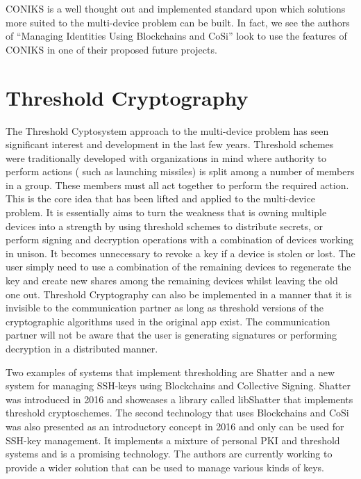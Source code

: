 CONIKS is a well thought out and implemented standard upon which solutions more suited to the multi-device problem can be built. In fact, we see the authors of ``Managing Identities Using Blockchains and CoSi'' \cite{Kokoris-kogias} look to use the features of CONIKS in one of their proposed future projects.


\section{Threshold Cryptography}

The Threshold Cyptosystem approach to the multi-device problem has seen significant interest and development in the last few years. Threshold schemes were traditionally developed with organizations in mind where authority to perform actions ( such as launching missiles) is split among a number of members in a group. These members must all act together to perform the required action. This is the core idea that has been lifted and applied to the multi-device problem. It is essentially aims to turn the weakness that is owning multiple devices into a strength by using threshold schemes to distribute secrets, or perform signing and decryption operations with a combination of devices working in unison\cite{Desmedt2001, Atwater2016}. It becomes unnecessary to revoke a key if a device is stolen or lost. The user simply need to use a combination of the remaining devices to regenerate the key and create new shares among the remaining devices whilst leaving the old one out. Threshold Cryptography can also be implemented in a manner that it is invisible to the communication partner as long as threshold versions of the cryptographic algorithms used in the original app exist. The communication partner will not be aware that the user is generating signatures or performing decryption in a distributed manner.

Two examples of systems that implement thresholding are Shatter \cite{Atwater2016} and a new system for managing SSH-keys using Blockchains and Collective Signing\cite{Kokoris-kogias}. Shatter was introduced in 2016 and showcases a library called libShatter that implements threshold cryptoschemes. The second technology that uses Blockchains and CoSi was also presented as an introductory concept in 2016 and only can be used for SSH-key management. It implements a mixture of personal PKI and threshold systems and is a promising technology. The authors are currently working to provide a wider solution that can be used to manage various kinds of keys.

